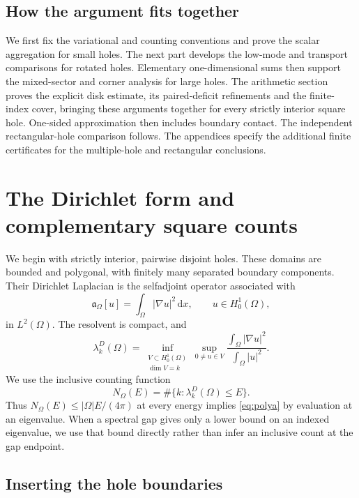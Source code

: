\documentclass[11pt,reqno]{amsart}
\numberwithin{equation}{section}
\newcommand{\dd}{\,\mathrm d}
\newcommand{\Om}{\Omega}
\begin{document}
\subsection*{How the argument fits together}

We first fix the variational and counting conventions
and prove the scalar aggregation for small holes. The next part
develops the low-mode and transport comparisons for rotated holes.
Elementary one-dimensional sums then support the mixed-sector and
corner analysis for large holes. The arithmetic section proves the
explicit disk estimate, its paired-deficit refinements and the
finite-index cover, bringing these arguments together for every
strictly interior square hole. One-sided approximation then includes
boundary contact. The independent rectangular-hole comparison follows.
The appendices specify the additional finite certificates
for the multiple-hole and rectangular conclusions.


\section{The Dirichlet form and complementary square counts}\label{sec:comparison}

We begin with strictly interior, pairwise disjoint holes. These
domains are bounded and polygonal, with finitely many separated
boundary components. Their Dirichlet Laplacian is
the selfadjoint operator associated with
\[
 \mathfrak a_\Om[u]=\int_\Om|\nabla u|^2\dd x,
 \qquad u\in H^1_0(\Om),
\]
in $L^2(\Om)$. The resolvent is compact, and
\begin{equation}\label{eq:minmax}
 \lambda_k^D(\Om)=
 \inf_{\substack{V\subset H^1_0(\Om)\\\dim V=k}}
 \sup_{0\ne u\in V}
 \frac{\int_\Om|\nabla u|^2}{\int_\Om|u|^2}.
\end{equation}
We use the inclusive counting function
\begin{equation}\label{eq:inclusive}
 N_\Om(E)=\#\{k:\lambda_k^D(\Om)\le E\}.
\end{equation}
Thus $N_\Om(E)\le|\Om|E/(4\pi)$ at every energy implies
\eqref{eq:polya} by evaluation at an eigenvalue. When a spectral
gap gives only a lower bound on an indexed eigenvalue, we use
that bound directly rather than infer an inclusive count at the
gap endpoint.

\subsection*{Inserting the hole boundaries}
\end{document}
